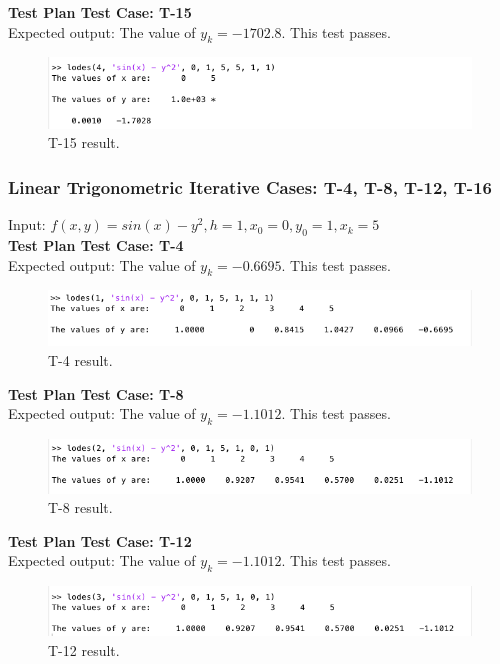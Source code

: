\documentclass[12pt, titlepage]{article}
\begin{document}
\textbf{Test Plan Test Case: T-15}\\
Expected output: The value of $y_k = -1702.8$. This test passes.\\
\begin{figure}[H]
 \includegraphics[width=\linewidth]{images/T15}
  \caption{T-15 result.}
  \label{fig:T15}
\end{figure}

\subsubsection{Linear Trigonometric Iterative Cases: T-4, T-8, T-12, T-16}
Input: $f(x,y) = sin(x) - y^2, h = 1, x_0 = 0,y_0 = 1,x_k = 5$\\

\textbf{Test Plan Test Case: T-4}\\
Expected output: The value of $y_k = -0.6695$. This test passes.\\
\begin{figure}[H]
 \includegraphics[width=\linewidth]{images/T4}
  \caption{T-4 result.}
  \label{fig:T4}
\end{figure}

\textbf{Test Plan Test Case: T-8}\\
Expected output: The value of $y_k = -1.1012$. This test passes.\\
\begin{figure}[H]
 \includegraphics[width=\linewidth]{images/T8}
  \caption{T-8 result.}
  \label{fig:T}
\end{figure}

\textbf{Test Plan Test Case: T-12}\\
Expected output: The value of $y_k = -1.1012$. This test passes.\\
\begin{figure}[H]
 \includegraphics[width=\linewidth]{images/T12}
  \caption{T-12 result.}
  \label{fig:T12}
\end{figure}
\end{document}
